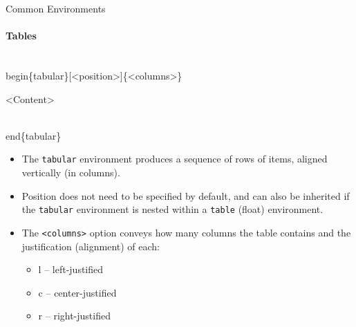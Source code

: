 \documentclass{beamer}
\begin{document}
\begin{frame}{Common Environments}
\framesubtitle{Tables}
	\begin{semiverbatim}
		\\begin\{tabular\}[<position>]\{<columns>\}
		
		 <Content>
			
		\\end\{tabular\}
	\end{semiverbatim}
	\begin{itemize}
		\item<2-> The \texttt{tabular} environment produces a sequence of rows of items, aligned vertically (in columns).
		\item<3-> Position does not need to be specified by default, and can also be inherited if the \texttt{tabular} environment is nested within a \texttt{table} (float) environment.
		\item<4-> The \texttt{<columns>} option conveys how many columns the table contains and the justification (alignment) of each:
			\begin{itemize}
				\item l -- left-justified
				\item c -- center-justified
				\item r -- right-justified
			\end{itemize}
	\end{itemize}
\end{frame}
\end{document}
